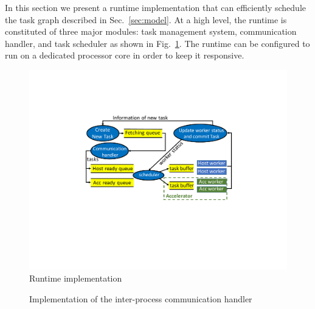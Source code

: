 In this section we present a runtime implementation that can efficiently schedule the task graph described in Sec.~\ref{sec:model}.
At a high level, the runtime is constituted of three major modules: task management system, communication handler, and task scheduler as shown in Fig.~\ref{fig:impl}. 
The runtime can be configured to run on a dedicated processor core in order to keep it responsive.

\begin{figure}[htb]
\centering
\includegraphics[width=.6\textwidth]{figures/impl.pdf}
\caption{Runtime implementation}
\label{fig:impl}
\end{figure}


\begin{figure}[htb]
\centering
{}\hspace{1cm}
\caption{Implementation of the inter-process communication handler}
\end{figure}

